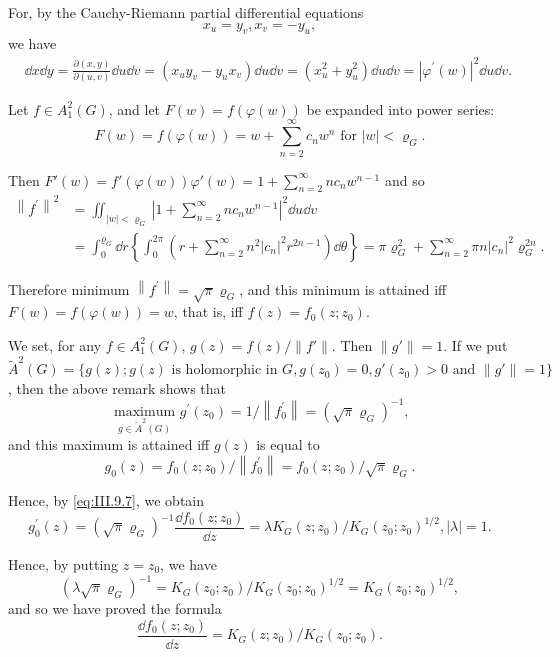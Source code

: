 For, by the Cauchy-Riemann partial differential equations 
\[
x _{u} = y _{v}, x _{v} = - y _{u},
\]
we have 
\[
\begin{aligned}
&\dd x \dd y  = \frac {\partial (x , y)}{\partial (u , v)} \dd u \dd v = (x _{u} y _{v} - y _{u} x _{v}) \dd u \dd v = (x _{u} ^{2} + y _{u} ^{2}) \dd u \dd v = | \varphi^{\prime} (w) | ^{2} \dd u \dd v.
\end{aligned}
\]

Let $f \in A_1^2(G)$, and let $F(w) = f(\varphi(w))$ be expanded into power series: 
\[
F (w) = f (\varphi (w)) = w + \sum\limits_{n=2} ^{\infty} c _{n} w ^{n} \text{ for } | w | < \varrho_{G}.
\]

Then $F'(w) = f'(\varphi(w)) \varphi'(w) = 1 + \sum\limits_{n=2}^{\infty} n c_n w^{n-1}$ and so 
\[
\begin{aligned}
\left\| f ^{\prime} \right\| ^{2} &= \iint_ {| w | < \varrho_{G}} \left| 1 + \sum\limits_{n=2} ^{\infty} n c _{n} w ^{n-1} \right| ^{2} \dd u \dd v
\\
&= \int_{0} ^ {\varrho_{G}} \dd r \left\{\int_{0} ^{2 \pi} \left(r + \sum\limits_{n=2} ^{\infty} n ^{2} \left| c _{n} \right| ^{2} r ^{2n-1}\right) \dd \theta \right\} = \pi \varrho_{G} ^{2} + \sum\limits_{n=2} ^{\infty} \pi n \left| c _{n} \right| ^{2} \varrho_{G} ^{2n}.
\end{aligned}
\]

Therefore minimum $\left\|f^{\prime}\right\|=\sqrt{\pi}\varrho_{G}$, and this minimum is attained iff $F(w)=f(\varphi(w))=w$, that is, iff $f(z)=f_{0}(z;z_{0})$. 

We set, for any $f \in A_1^2(G)$, $g(z) = f(z) / \|f'\|$. Then $\|g'\| = 1$. If we put $\tilde{A}^2(G) = \{g(z); g(z) \text{ is holomorphic in } G, g(z_0) = 0, g'(z_0) > 0 \text{ and } \|g'\| = 1\}$, 
then the above remark shows that 
\[
\underset {g \in \widetilde {A} ^{2} (G)} {\text{ maximum }} g ^{\prime} \left(z _{0}\right) = 1 / \left\| f _{0} ^{\prime} \right\| = (\sqrt {\pi} \varrho_{G}) ^{-1},
\]
and this maximum is attained iff $g(z)$ is equal to 
\[
g _{0} (z) = f _{0} \left(z; z _{0}\right) / \left\| f _{0} ^{\prime} \right\| = f _{0} \left(z; z _{0}\right) / \sqrt {\pi} \varrho_{G}.
\]

Hence, by \eqref{eq:III.9.7}, we obtain 
\[
g _{0} ^{\prime} (z) = (\sqrt {\pi} \varrho_{G}) ^{-1} \frac {\dd f _{0} (z ; z _{0})}{\dd z} = \lambda K _{G} (z; z _{0}) / K _{G} (z _{0}; z _{0}) ^{1/2}, | \lambda | = 1.
\]

Hence, by putting $z = z_0$, we have 
\[
\left(\lambda \sqrt {\pi} \varrho_{G}\right) ^{-1} = K _{G} (z _{0}; z _{0}) / K _{G} (z _{0}; z _{0}) ^{1/2} = K _{G} (z _{0}; z _{0}) ^{1/2},
\]
and so we have proved the formula 
\[
\frac {\dd f _{0} (z ; z _{0})}{\dd z} = K _{G} (z; z _{0}) / K _{G} (z _{0}; z _{0}).
\]


